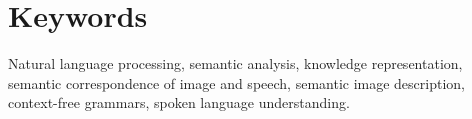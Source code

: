 
\section*{Keywords}
Natural language processing, semantic analysis, knowledge representation, semantic correspondence of image and speech, semantic image description,
context-free grammars, spoken language understanding.
\thispagestyle{empty}
